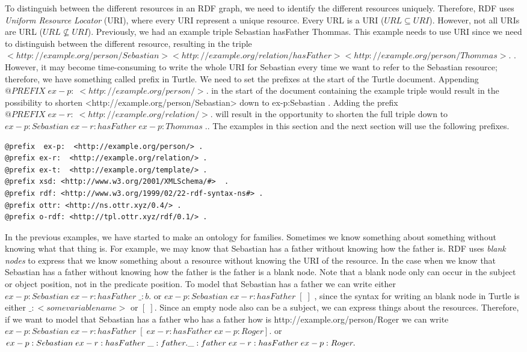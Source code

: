 \para
To distinguish between the different resources in an RDF graph, we need to identify the different resources uniquely. Therefore, RDF uses \emph{Uniform Resource Locator} (URI), where every URI represent a unique resource. Every URL is a URI ($URL\subseteq URI$). However, not all URIs are URL ($URL\nsubseteq URI$).  Previously, we had an example triple Sebastian hasFather Thommas. This example needs to use URI since we need to distinguish between the different resource, resulting in the triple $<http://example.org/person/Sebastian> <http://example.org/relation/hasFather> <http://example.org/person/Thommas> .$ . However, it may become time-consuming to write the whole URI for Sebastian every time we want to refer to the Sebastian resource; therefore, we have something called prefix in Turtle. We need to set the prefixes at the start of the Turtle document. Appending $@PREFIX\; ex-p:\; <http://example.org/person/>.$ in the start of the document containing the example triple would result in the possibility to shorten <http://example.org/person/Sebastian> down to ex-p:Sebastian . Adding the prefix $@PREFIX\; ex-r:\; <http://example.org/relation/>.$ will result in the opportunity to shorten the full triple down to $ex-p:Sebastian\; ex-r:hasFather\; ex-p:Thommas\; .$. The examples in this section and the next section will use the following prefixes.

\begin{lstlisting}[frame=single, language=turtle]
@prefix  ex-p:  <http://example.org/person/> . 
@prefix ex-r:  <http://example.org/relation/> . 
@prefix ex-t:  <http://example.org/template/> . 
@prefix xsd: <http://www.w3.org/2001/XMLSchema/#>  . 
@prefix rdf: <http://www.w3.org/1999/02/22-rdf-syntax-ns#> .
@prefix ottr: <http://ns.ottr.xyz/0.4/> .
@prefix o-rdf: <http://tpl.ottr.xyz/rdf/0.1/> .
\end{lstlisting}

\para
In the previous examples, we have started to make an ontology for families. Sometimes we know something about something without knowing what that thing is. For example, we may know that Sebastian has a father without knowing how the father is. RDF uses \emph{blank nodes} to express that we know something about a resource without knowing the URI of the resource. In the case when we know that Sebastian has a father without knowing how the father is the father is a blank node. Note that a blank node only can occur in the subject or object position, not in the predicate position. To model that Sebastian has a father we can write either $ex-p:Sebastian\; ex-r:hasFather\; \_:b .$ or $ex-p:Sebastian\; ex-r:hasFather\; [\; ]$ , since the syntax for writing an blank node in Turtle is either $\_:<some variable name>$ or $[\; ]$. Since an empty node also can be a subject, we can express things about the resources. Therefore, if we want to model that Sebastian has a father who has a father how is http://example.org/person/Roger we can write $ex-p:Sebastian\; ex-r:hasFather\; [\; ex-r:hasFather\; ex-p:Roger] .$ or $ex-p:Sebastian\; ex-r:hasFather\; \_:father . \\ \_:father \; ex-r:hasFather\; ex-p:Roger .$

